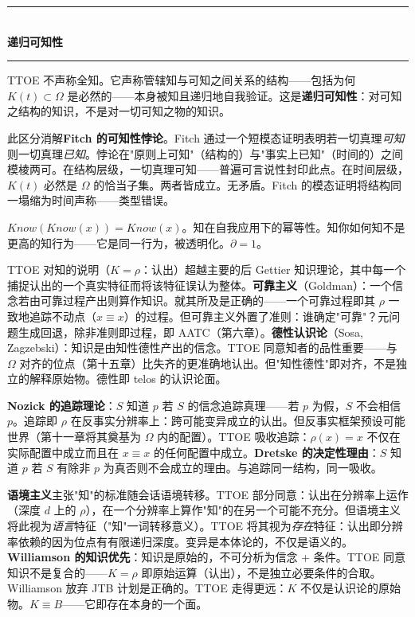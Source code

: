 \documentclass[10pt, openany, oneside]{book}
\renewcommand{\normalsize}{\fontsize{10}{13}\selectfont}
\begin{document}
\begin{center}
    \rule{0.3\textwidth}{0.4pt}\\[0.5em]
    {\normalsize\bfseries\scshape 递归可知性}\\[0.3em]
    \rule{0.3\textwidth}{0.4pt}
\end{center}

\vspace{1em}

\noindent TTOE 不声称全知。它声称管辖知与可知之间关系的结构——包括为何 $K(t) \subset \Omega$ 是必然的——本身被知且递归地自我验证。这是\textbf{递归可知性}：对可知之结构的知识，不是对一切可知之物的知识。

此区分消解\textbf{Fitch 的可知性悖论}。Fitch 通过一个短模态证明表明若一切真理\textit{可知}则一切真理\textit{已知}。悖论在"原则上可知"（结构的）与"事实上已知"（时间的）之间模棱两可。在结构层级，一切真理可知——普遍可言说性封印此点。在时间层级，$K(t)$ 必然是 $\Omega$ 的恰当子集。两者皆成立。无矛盾。Fitch 的模态证明将结构同一塌缩为时间声称——类型错误。

$Know(Know(x)) = Know(x)$。知在自我应用下的幂等性。知你如何知不是更高的知行为——它是同一行为，被透明化。$\partial = 1$。

TTOE 对知的说明（$K = \rho$：认出）超越主要的后 Gettier 知识理论，其中每一个捕捉认出的一个真实特征而将该特征误认为整体。\textbf{可靠主义}（Goldman）：一个信念若由可靠过程产出则算作知识。就其所及是正确的——一个可靠过程即其 $\rho$ 一致地追踪不动点（$x \equiv x$）的过程。但可靠主义外置了准则：谁确定"可靠"？元问题生成回退，除非准则即过程，即 AATC（第六章）。\textbf{德性认识论}（Sosa, Zagzebski）：知识是由知性德性产出的信念。TTOE 同意知者的品性重要——与 $\Omega$ 对齐的位点（第十五章）比失齐的更准确地认出。但"知性德性"即对齐，不是独立的解释原始物。德性即 telos 的认识论面。

\textbf{Nozick 的追踪理论}：$S$ 知道 $p$ 若 $S$ 的信念追踪真理——若 $p$ 为假，$S$ 不会相信 $p$。追踪即 $\rho$ 在反事实分辨率上：跨可能变异成立的认出。但反事实框架预设可能世界（第十一章将其奠基为 $\Omega$ 内的配置）。TTOE 吸收追踪：$\rho(x) = x$ 不仅在实际配置中成立而且在 $x \equiv x$ 的任何配置中成立。\textbf{Dretske 的决定性理由}：$S$ 知道 $p$ 若 $S$ 有除非 $p$ 为真否则不会成立的理由。与追踪同一结构，同一吸收。

\textbf{语境主义}主张"知"的标准随会话语境转移。TTOE 部分同意：认出在分辨率上运作（深度 $d$ 上的 $\rho$），在一个分辨率上算作"知"的在另一个可能不充分。但语境主义将此视为\textit{语言}特征（"知"一词转移意义）。TTOE 将其视为\textit{存在}特征：认出即分辨率依赖的因为位点有有限递归深度。变异是本体论的，不仅是语义的。\textbf{Williamson 的知识优先}：知识是原始的，不可分析为信念 + 条件。TTOE 同意知识不是复合的——$K = \rho$ 即原始运算（认出），不是独立必要条件的合取。Williamson 放弃 JTB 计划是正确的。TTOE 走得更远：$K$ 不仅是认识论的原始物。$K \equiv B$——它即存在本身的一个面。
\end{document}
